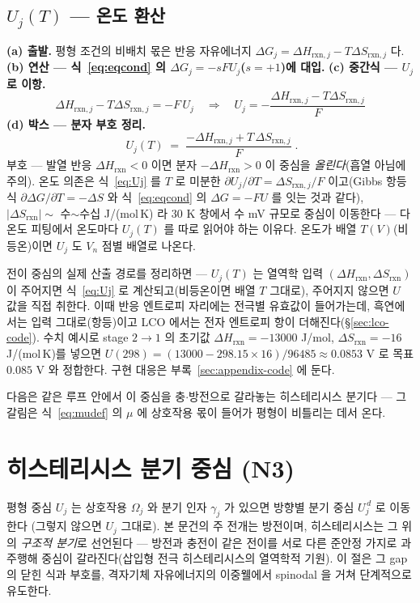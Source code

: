 \documentclass[11pt,a4paper]{article}
\newcommand{\rxn}{\mathrm{rxn}}
\begin{document}
\subsection{$U_j(T)$ — 온도 환산}
\textbf{(a) 출발.} 평형 조건의 비배치 몫은 반응 자유에너지 $\Delta G_j=\Delta H_{\rxn,j}-T\Delta S_{\rxn,j}$ 다.
\textbf{(b) 연산 — 식~\eqref{eq:eqcond} 의 $\Delta G_j=-sFU_j$($s=+1$)에 대입.} \textbf{(c) 중간식 — $U_j$ 로 이항.}
\begin{equation}
\Delta H_{\rxn,j}-T\Delta S_{\rxn,j}=-F\,U_j
\quad\Longrightarrow\quad
U_j=-\frac{\Delta H_{\rxn,j}-T\Delta S_{\rxn,j}}{F}
\label{eq:Ujmid}
\end{equation}
\textbf{(d) 박스 — 분자 부호 정리.}
\begin{equation}
\boxed{\;U_j(T)\;=\;\frac{-\Delta H_{\rxn,j}+T\,\Delta S_{\rxn,j}}{F}\;.}
\label{eq:Uj}
\end{equation}
부호 — 발열 반응
$\Delta H_\rxn<0$ 이면 분자 $-\Delta H_\rxn>0$ 이 중심을 \emph{올린다}(흡열 아님에 주의). 온도 의존은 식~\eqref{eq:Uj} 를
$T$ 로 미분한 $\partial U_j/\partial T=\Delta S_{\rxn,j}/F$ 이고(Gibbs 항등식 $\partial\Delta G/\partial T=-\Delta S$ 와
식~\eqref{eq:eqcond} 의 $\Delta G=-FU$ 를 잇는 것과 같다), $|\Delta S_\rxn|\sim$ 수$\sim$수십 J/(mol\,K) 라 $30$ K
창에서 수 mV 규모로 중심이 이동한다 — 다온도 피팅에서 온도마다 $U_j(T)$ 를 따로 읽어야 하는 이유다. 온도가 배열
$T(V)$(비등온)이면 $U_j$ 도 $V_n$ 점별 배열로 나온다.

전이 중심의 실제 산출 경로를 정리하면 — $U_j(T)$ 는 열역학 입력 $(\Delta H_\rxn,\Delta S_\rxn)$ 이 주어지면
식~\eqref{eq:Uj} 로 계산되고(비등온이면 배열 $T$ 그대로), 주어지지 않으면 $U$ 값을 직접 취한다. 이때
반응 엔트로피 자리에는 전극별 유효값이 들어가는데, 흑연에서는 입력 그대로(항등)이고 LCO 에서는 전자
엔트로피 항이 더해진다(\S\ref{sec:lco-code}). 수치 예시로 stage $2\to1$ 의 초기값
$\Delta H_\rxn=-13000$ J/mol, $\Delta S_\rxn=-16$ J/(mol\,K)를 넣으면
$U(298)=(13000-298.15\times16)/96485\approx0.0853$ V 로 목표 $0.085$ V 와 정합한다. 구현 대응은
부록~\ref{sec:appendix-code} 에 둔다.

다음은 같은 루프 안에서 이 중심을 충$\cdot$방전으로 갈라놓는 히스테리시스 분기다 — 그 갈림은 식~\eqref{eq:mudef} 의
$\mu$ 에 상호작용 몫이 들어가 평형이 비틀리는 데서 온다.

\section{히스테리시스 분기 중심 (N3)}\label{sec:hys}
평형 중심 $U_j$ 는 상호작용 $\Omega_j$ 와 분기 인자 $\gamma_j$ 가 있으면 방향별 분기 중심 $U_j^{\,d}$ 로 이동한다
(그렇지 않으면 $U_j$ 그대로). 본 문건의 주 전개는 방전이며, 히스테리시스는 그 위의 \emph{구조적 분기}로 선언된다 — 방전과 충전이
같은 전이를 서로 다른 준안정 가지로 과주행해 중심이 갈라진다(삽입형 전극 히스테리시스의 열역학적 기원\cite{dreyer2010}).
이 절은 그 gap 의 닫힌 식과 부호를, 격자기체 자유에너지의
이중웰에서 spinodal 을 거쳐 단계적으로 유도한다.
\end{document}
